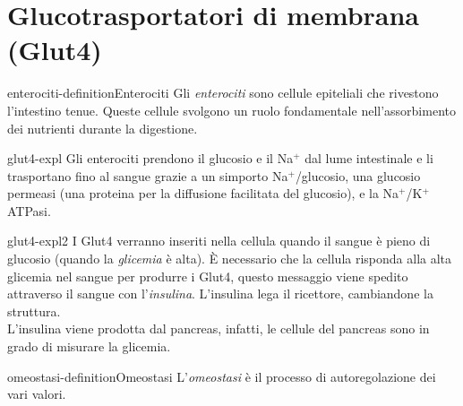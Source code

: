 \documentclass[preview]{standalone}
\begin{document}
\genpage

\section{Glucotrasportatori di membrana (Glut4)}

\begin{snippetdefinition}{enterociti-definition}{Enterociti}
    Gli \textit{enterociti} sono cellule epiteliali che rivestono l'intestino tenue.
    Queste cellule svolgono un ruolo fondamentale nell'assorbimento dei nutrienti durante la digestione.
\end{snippetdefinition}

\begin{snippet}{glut4-expl}
    Gli enterociti prendono il glucosio e il Na\({}^+\) dal lume intestinale
    e li trasportano fino al sangue grazie a un simporto Na\({}^+\)/glucosio, una glucosio permeasi
    (una proteina per la diffusione facilitata del glucosio), e la Na\({}^+\)/K\({}^+\)ATPasi. 
\end{snippet}



\begin{snippet}{glut4-expl2}
    I Glut4 verranno inseriti nella cellula quando il sangue è pieno di glucosio (quando la \textit{glicemia} è alta).
È necessario che la cellula risponda alla alta glicemia nel sangue per produrre i Glut4,
questo messaggio viene spedito attraverso il sangue con l'\textit{insulina}.
L'insulina lega il ricettore, cambiandone la struttura. \\
L'insulina viene prodotta dal pancreas, infatti, le cellule del pancreas sono in grado di misurare la glicemia.
\end{snippet}



\begin{snippetdefinition}{omeostasi-definition}{Omeostasi}
    L'\textit{omeostasi} è il processo di autoregolazione dei vari valori.
\end{snippetdefinition}


\end{document}
